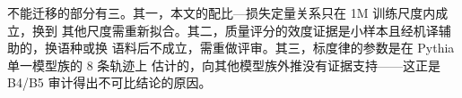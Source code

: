 \documentclass[bwprint]{gmcmthesis}
\numberwithin{equation}{section}
\numberwithin{figure}{section}
\numberwithin{table}{section}
\begin{document}
不能迁移的部分有三。其一，本文的配比—损失定量关系只在 1M 训练尺度内成立，换到
其他尺度需重新拟合。其二，质量评分的效度证据是小样本且经机译辅助的，换语种或换
语料后不成立，需重做评审。其三，标度律的参数是在 Pythia 单一模型族的 8 条轨迹上
估计的，向其他模型族外推没有证据支持——这正是 B4/B5 审计得出不可比结论的原因。





\end{document}
